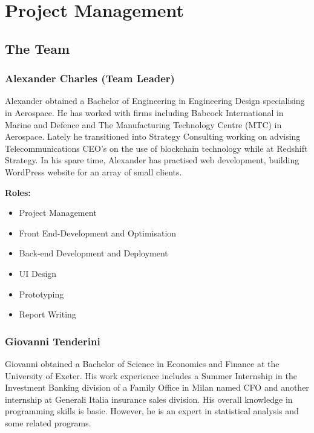 \hypertarget{project-management}{%
\section{Project Management}\label{project-management}}

\hypertarget{the-team}{%
\subsection{The Team}\label{the-team}}

\hypertarget{alexander-charles-team-leader}{%
\subsubsection{Alexander Charles (Team
Leader)}\label{alexander-charles-team-leader}}

Alexander obtained a Bachelor of Engineering in Engineering Design
specialising in Aerospace. He has worked with firms including Babcock
International in Marine and Defence and The Manufacturing Technology
Centre (MTC) in Aerospace. Lately he transitioned into Strategy
Consulting working on advising Telecommunications CEO's on the use of
blockchain technology while at Redshift Strategy. In his spare time,
Alexander has practised web development, building WordPress website for
an array of small clients.

\textbf{Roles:}

\begin{itemize}
\tightlist
\item
  Project Management
\item
  Front End-Development and Optimisation
\item
  Back-end Development and Deployment
\item
  UI Design
\item
  Prototyping
\item
  Report Writing
\end{itemize}

\hypertarget{giovanni-tenderini}{%
\subsubsection{Giovanni Tenderini}\label{giovanni-tenderini}}

Giovanni obtained a Bachelor of Science in Economics and Finance at the
University of Exeter. His work experience includes a Summer Internship
in the Investment Banking division of a Family Office in Milan named CFO
and another internship at Generali Italia insurance sales division. His
overall knowledge in programming skills is basic. However, he is an
expert in statistical analysis and some related programs.

